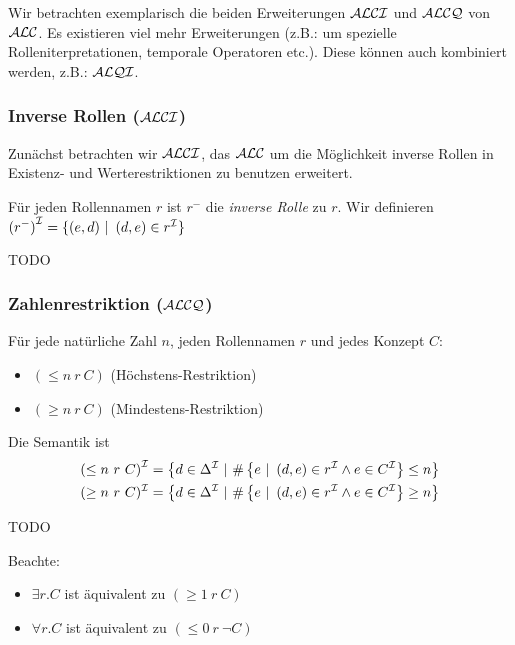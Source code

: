 Wir betrachten exemplarisch die beiden Erweiterungen $\mathcal{A}\mathcal{L}\mathcal{C}\mathcal{I}$ und $\mathcal{A}\mathcal{L}\mathcal{C}\mathcal{Q}$ von $\mathcal{A}\mathcal{L}\mathcal{C}$. Es existieren viel mehr Erweiterungen (z.B.: um spezielle Rolleniterpretationen, temporale Operatoren etc.). Diese können auch kombiniert werden, z.B.: $\mathcal{A}\mathcal{L}\mathcal{Q}\mathcal{I}$.

\subsubsection{Inverse Rollen (\texorpdfstring{$\mathcal{A}\mathcal{L}\mathcal{C}\mathcal{I}$}{ALCI})}\label{inverse-rollen-alci}

Zunächst betrachten wir $\mathcal{A}\mathcal{L}\mathcal{C}\mathcal{I}$, das $\mathcal{A}\mathcal{L}\mathcal{C}$ um die Möglichkeit inverse Rollen in Existenz- und Werterestriktionen zu benutzen erweitert.

\begin{definition}
Für jeden Rollennamen $r$ ist $r^{-}$ die \emph{inverse
Rolle} zu $r$. Wir definieren
$\left( r^{-} \right)^{\mathcal{I}} = \left\{ \left( e,d \right)\  \right|\ \left( d,e \right) \in r^{\mathcal{I}}\}$
\end{definition}

\begin{tafel}
    TODO
\end{tafel}

\subsubsection{Zahlenrestriktion (\texorpdfstring{$\mathcal{A}\mathcal{L}\mathcal{C}\mathcal{Q}$}{ALCQ})}\label{zahlenrestriktion-alcq}

\begin{definition}[Zahlenrestriktion]
Für jede natürliche Zahl $n$, jeden Rollennamen $r$ und
jedes Konzept $C$:

\begin{itemize}
  \item $\left( \leq n\ r\ C \right)$ (Höchstens-Restriktion)
  \item $\left( \geq n\ r\ C \right)$ (Mindestens-Restriktion)
\end{itemize}

Die Semantik ist \begin{align*}
    \left( \leq n\ r\ C \right)^\MI &= \left\{ d \in \Delta^\MI\ |\ \#\left\{ e\ |\ \left( d,e \right) \in r^\MI \land e \in C^\MI \right\} \leq n \right\}\\
    ( \geq n\ r\ C)^\MI &= \left\{ d \in \Delta^\MI\ |\ \#\left\{ e\ |\ \left( d,e \right) \in r^\MI \land e \in C^\MI \right\} \geq n \right\}
\end{align*}
\end{definition}

\begin{tafel}
    TODO
\end{tafel}

Beachte:

\begin{itemize}
  \item $\exists r.C$ ist äquivalent zu $(\geq 1\ r\ C)$
  \item $\forall r.C$ ist äquivalent zu $(\leq 0\ r\ \neg C)$
\end{itemize}
